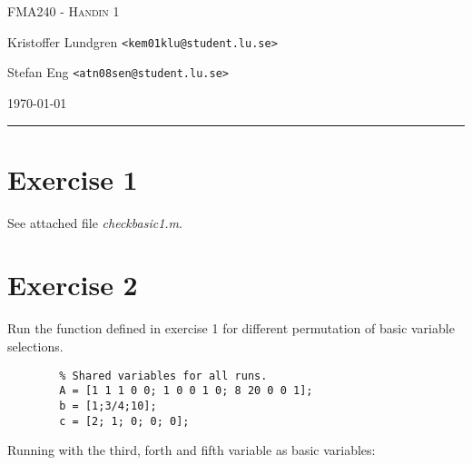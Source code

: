 \documentclass{article}
\begin{document}
\newcommand\encircle[1]{%
  \tikz[baseline=(X.base)]
    \node (X) [draw, shape=circle, inner sep=0] {\strut #1};}



\begin{centering}
	{\scshape\Large FMA240 - Handin 1\par}
	\vspace{0.5cm}
	Kristoffer Lundgren \texttt{<kem01klu@student.lu.se>}\par
	Stefan Eng \texttt{<atn08sen@student.lu.se>}\par
    \vspace{0.5cm}
	\today\par
    \rule{\textwidth}{0.4pt}
\end{centering}

\section*{Exercise 1}

    See attached file \textit{checkbasic1.m}.

\section*{Exercise 2}

    Run the function defined in exercise 1 for different permutation of
    basic variable selections.

    \begin{lstlisting}
        % Shared variables for all runs.
        A = [1 1 1 0 0; 1 0 0 1 0; 8 20 0 0 1];
        b = [1;3/4;10];
        c = [2; 1; 0; 0; 0];
    \end{lstlisting}

    Running with the third, forth and fifth variable as basic variables:
\end{document}
